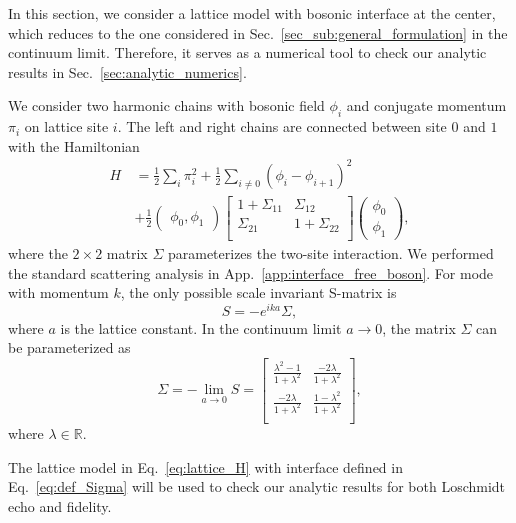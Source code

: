 
In this section, we consider a lattice model with bosonic interface at the center\cite{peschel_exact_2012,calabrese_entanglement_2012}, which reduces to the one considered in Sec.~\ref{sec_sub:general_formulation} in the continuum limit\cite{sakai_entanglement_2008}. Therefore, it serves as a numerical tool to check our analytic results in Sec.~\ref{sec:analytic_numerics}. 


We consider two harmonic chains with bosonic field $\phi_i$ and conjugate momentum $\pi_i$ on lattice site $i$. The left and right chains are connected between site $0$ and $1$ with the Hamiltonian
\begin{equation}
\begin{aligned}
\label{eq:lattice_H}
H &= \frac{1}{2} \sum_i \pi_i^2  +  \frac{1}{2} \sum_{i\ne 0 }  ( \phi_i - \phi_{i+1} )^2 \\
\quad & + \frac{1}{2} \begin{pmatrix}  \phi_0, \phi_1 \end{pmatrix}
\begin{bmatrix}
1 + \Sigma_{11}  & \Sigma_{12} \\
\Sigma_{21} &  1 + \Sigma_{22} \\
\end{bmatrix}
\begin{pmatrix}
\phi_0 \\
\phi_1 
\end{pmatrix},
\end{aligned}
\end{equation}
where the $2\times2$ matrix $\Sigma$ parameterizes the two-site interaction. We performed the standard scattering analysis in App.~\ref{app:interface_free_boson}. For mode with momentum $k$, the only possible scale invariant S-matrix is
\begin{equation}
S = - e^{ika} \Sigma,
\end{equation}
where $a$ is the lattice constant. In the continuum limit $a\rightarrow0$, the matrix $\Sigma$ can be parameterized as
\begin{equation}
\label{eq:def_Sigma}
\Sigma = -\lim_{a \rightarrow 0 } S = 
\begin{bmatrix}
\frac{\lambda^2- 1}{1 + \lambda^2} & \frac{-2\lambda }{1 + \lambda^2} \\
\frac{-2\lambda }{1 + \lambda^2} & \frac{1- \lambda^2}{1 + \lambda^2} \\
\end{bmatrix},
\end{equation}
where $\lambda\in\mathbb{R}$. 

The lattice model in Eq.~\eqref{eq:lattice_H} with interface defined in Eq.~\eqref{eq:def_Sigma} will be used to check our analytic results for both Loschmidt echo and fidelity.  


